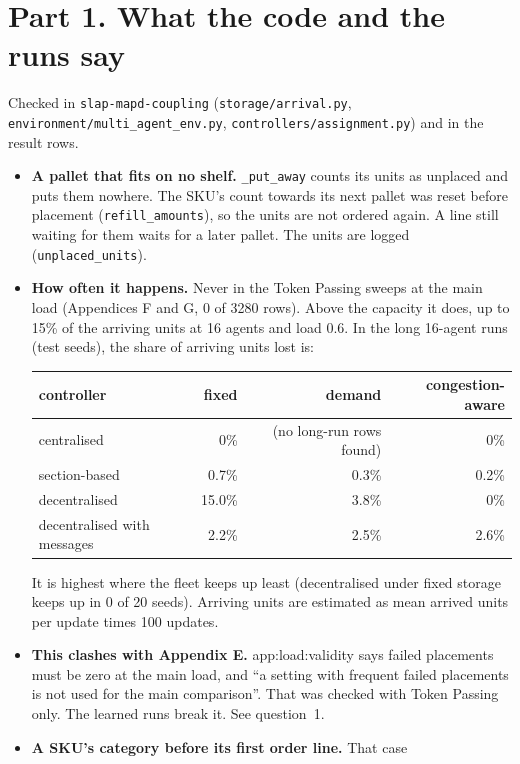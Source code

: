 \documentclass[11pt,a4paper]{article}
\newcommand{\lab}[1]{\textsf{\footnotesize #1}}
\begin{document}
\section*{Part 1. What the code and the runs say}
Checked in \texttt{slap-mapd-coupling} (\texttt{storage/arrival.py},
\texttt{environment/multi\_agent\_env.py},
\texttt{controllers/assignment.py}) and in the result rows.
\begin{itemize}[nosep]
  \item \textbf{A pallet that fits on no shelf.} \texttt{\_put\_away} counts
    its units as unplaced and puts them nowhere. The SKU's count towards
    its next pallet was reset before placement (\texttt{refill\_amounts}),
    so the units are not ordered again. A line still waiting for them waits
    for a later pallet. The units are logged (\texttt{unplaced\_units}).
  \item \textbf{How often it happens.} Never in the Token Passing sweeps
    at the main load (Appendices F and G, 0 of 3280 rows). Above the
    capacity it does, up to 15\% of the arriving units at 16 agents and
    load 0.6. In the long 16-agent runs (test seeds), the share of arriving
    units lost is:
    \begin{center}\small
    \begin{tabular}{lrrr}
    \toprule
    controller & fixed & demand & congestion-aware \\
    \midrule
    centralised & 0\% & (no long-run rows found) & 0\% \\
    section-based & 0.7\% & 0.3\% & 0.2\% \\
    decentralised & 15.0\% & 3.8\% & 0\% \\
    decentralised with messages & 2.2\% & 2.5\% & 2.6\% \\
    \bottomrule
    \end{tabular}
    \end{center}
    It is highest where the fleet keeps up least (decentralised under
    fixed storage keeps up in 0 of 20 seeds). Arriving units are estimated
    as mean arrived units per update times 100 updates.
  \item \textbf{This clashes with Appendix E.} \lab{app:load:validity} says
    failed placements must be zero at the main load, and ``a setting with
    frequent failed placements is not used for the main comparison''. That
    was checked with Token Passing only. The learned runs break it. See
    question~1.
  \item \textbf{A SKU's category before its first order line.} That case

\end{itemize}
\end{document}
